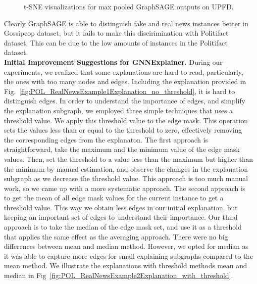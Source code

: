 \begin{figure}
    \centering
    \hfill
    \caption[t-SNE visualizations for GraphSAGE]{t-SNE visualizations for max pooled GraphSAGE outputs on UPFD.}
    \label{fig:TSNE_GraphSAGE}
\end{figure}
Clearly GraphSAGE is able to distinguish fake and real news instances better in Gossipcop dataset, but it fails to make this discirimination with Politifact dataset. This can be due to the low amounts of instances in the Politifact dataset.\\
\textbf{Initial Improvement Suggestions for GNNExplainer.} During our experiments, we realized that some explanations are hard to read, particularly, the ones with too many nodes and edges. Including the explanation provided in Fig.~\ref{fig:POL_RealNewsExample1Explanation_no_threshold}, it is hard to distinguish edges. In order to understand the importance of edges, and simplify the explanation subgraph, we employed three simple techniques that uses a threshold value. We apply this threshold value to the edge mask. This operation  sets the values less than or equal to the threshold to zero, effectively removing the corresponding edges from the explanaton. The first approach is straightforward, take the maximum and the minimum value of the edge mask values. Then, set the threshold to a value less than the maximum but higher than the minimum by manual estimation, and observe the changes in the explanation subgraph as we decrease the threshold value. This approach is too much manual work, so we came up with a more systematic approach. The second approach is to get the mean of all edge mask values for the current instance to get a threshold value. This way we obtain less edges in our initial explanation, but keeping an important set of edges to understand their importance. Our third approach is to take the median of the edge mask set, and use it as a threshold that applies the same effect as the averaging approach. There were no big differences between mean and median method. However, we opted for median as it was able to capture more edges for small explaining subgraphs compared to the mean method. We illustrate the explanations with threshold methods mean and median in Fig~\ref{fig:POL_RealNewsExample2Explanation_with_threshold}.\\
